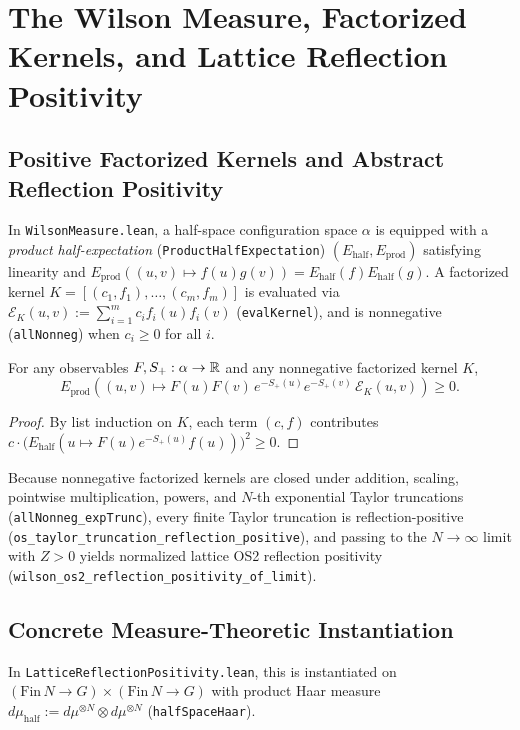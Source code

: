 \section{The Wilson Measure, Factorized Kernels, and Lattice Reflection Positivity}
\label{sec:ch3}

\subsection{Positive Factorized Kernels and Abstract Reflection Positivity}
In \texttt{WilsonMeasure.lean}, a half-space configuration space $\alpha$ is equipped with a \emph{product half-expectation} (\texttt{ProductHalfExpectation}) $(E_{\mathrm{half}}, E_{\mathrm{prod}})$ satisfying linearity and $E_{\mathrm{prod}}((u, v) \mapsto f(u) g(v)) = E_{\mathrm{half}}(f) E_{\mathrm{half}}(g)$. A factorized kernel $K = [(c_1, f_1), \dots, (c_m, f_m)]$ is evaluated via $\mathcal{E}_K(u, v) := \sum_{i=1}^m c_i f_i(u) f_i(v)$ (\texttt{evalKernel}), and is nonnegative (\texttt{allNonneg}) when $c_i \ge 0$ for all $i$.

\begin{theorem}
\label{thm:abstract_rp}
For any observables $F, S_+ : \alpha \to \mathbb{R}$ and any nonnegative factorized kernel $K$,
\begin{equation}
E_{\mathrm{prod}}\!\left((u, v) \mapsto F(u) F(v) \, e^{-S_+(u)} e^{-S_+(v)} \, \mathcal{E}_K(u, v)\right) \ge 0.
\end{equation}
\end{theorem}

\begin{proof}
By list induction on $K$, each term $(c, f)$ contributes $c \cdot \big(E_{\mathrm{half}}(u \mapsto F(u) e^{-S_+(u)} f(u))\big)^2 \ge 0$.
\end{proof}

Because nonnegative factorized kernels are closed under addition, scaling, pointwise multiplication, powers, and $N$-th exponential Taylor truncations (\texttt{allNonneg\_expTrunc}), every finite Taylor truncation is reflection-positive (\texttt{os\_taylor\_truncation\_reflection\_positive}), and passing to the $N \to \infty$ limit with $Z > 0$ yields normalized lattice OS2 reflection positivity (\texttt{wilson\_os2\_reflection\_positivity\_of\_limit}).

\subsection{Concrete Measure-Theoretic Instantiation}
In \texttt{LatticeReflectionPositivity.lean}, this is instantiated on $(\mathrm{Fin}\,N \to G) \times (\mathrm{Fin}\,N \to G)$ with product Haar measure $d\mu_{\mathrm{half}} := d\mu^{\otimes N} \otimes d\mu^{\otimes N}$ (\texttt{halfSpaceHaar}).

